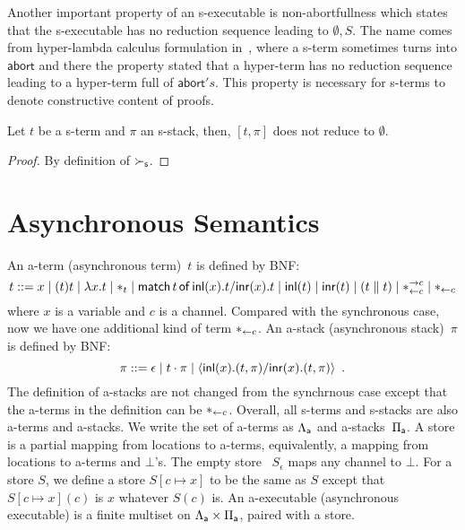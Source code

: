 Another important property of an s-executable is
non-abortfullness
which states that the s-executable has no reduction sequence leading to
$\emptyset,S$.
The name comes from hyper-lambda calculus formulation in~\citep{hiraiflops2012},
where a s-term sometimes turns into $\mathsf{abort}$ and there the property
stated that a hyper-term has no reduction sequence leading to a hyper-term
full of $\mathsf{abort}'s$.
This property is necessary for s-terms to denote
constructive content of proofs.

\begin{proposition}
 Let $t$ be a s-term and $\pi$ an s-stack, then,
 $[t,\pi]$ does not reduce to $\emptyset$.
\end{proposition}
\begin{proof}
 By definition of $\succ_{\mathsf s}$.
\end{proof}

\section{Asynchronous Semantics}
\label{sec:async}

An a-term (asynchronous term)~$t$ is defined by BNF:
\[
 t::= x
 \mid (t)t
 \mid \lambda x.t
 \mid \ast_t
 \mid \mathsf{match}\,{t}\,\mathsf{of}\, \mathsf{inl}({x}). {t}/ \mathsf{inr}({x}). {t}
 \mid \mathsf{inl}({t})
 \mid \mathsf{inr}({t})
 \mid (t\parallel t)
 \mid \ast^{\rightarrow {c}}_{\leftarrow{c}}
 \mid \ast_{\leftarrow{c}}
\]
where $x$ is a variable and $c$ is a channel.
Compared with the synchronous case, now we have one additional kind of term
$\ast_{\leftarrow{c}}$.
An a-stack (asynchronous stack)~$\pi$ is defined by BNF:
\[
 \pi ::= \epsilon
 \mid t\cdot \pi
 \mid \langle \mathsf{inl}({x}). ({t},{\pi})/ \mathsf{inr}({x}). ({t},{\pi})\rangle
 \enspace.
\]
The definition of a-stacks are not changed from the synchrnous case except
that the a-terms in the definition can be $\ast_{\leftarrow{c}}$.
Overall, all s-terms and s-stacks are also a-terms and a-stacks.
We write the set of a-terms as $\Lambda_{\mathsf a}$ and a-stacks~$\Pi_{\mathsf a}$.
A store is a partial mapping from locations to
a-terms, equivalently, a mapping from locations to a-terms and $\bot$'s.
The empty store%
~$S_\epsilon$ maps any channel to $\bot$.
For a store $S$, we define a store $S[c\mapsto x]$ to be
the same as $S$ except that $S[c\mapsto x](c)$ is $x$ whatever $S(c)$ is.
An a-executable (asynchronous executable)
is a finite multiset on $\Lambda_{\mathsf a} \times \Pi_{\mathsf a}$,
paired with a store.

